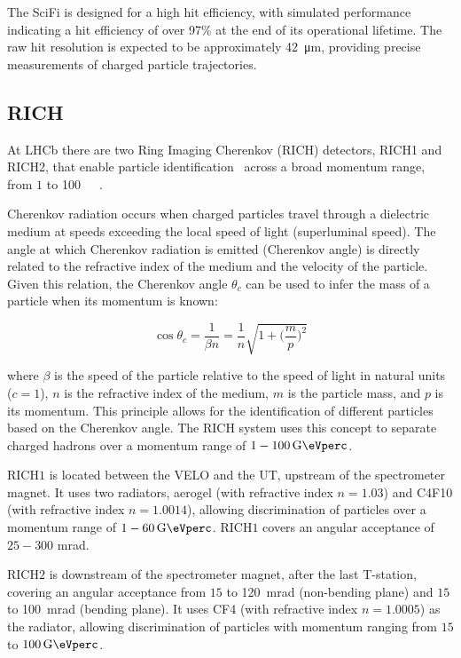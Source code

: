 The SciFi is designed for a high hit efficiency, with simulated performance indicating a hit efficiency of over 97\% at the end of its operational lifetime. The raw hit resolution is expected to be approximately \SI{42}{\micro\meter}, providing precise measurements of charged particle trajectories.

\subsection{RICH}
At LHCb there are two Ring Imaging Cherenkov (RICH) detectors, RICH1 and RICH2, that enable particle identification~\cite{LHCb:2013urp} across a broad momentum range, from $1$ to \SI[per-mode=symbol]{100}{\giga\eVperc}~\cite{Adinolfi_2013}.

Cherenkov radiation occurs when charged particles travel through a dielectric medium at speeds exceeding the local speed of light (superluminal speed). The angle at which Cherenkov radiation is emitted (Cherenkov angle) is directly related to the refractive index of the medium and the velocity of the particle. Given this relation, the Cherenkov angle $\theta_c$ can be used to infer the mass of a particle when its momentum is known:

\begin{equation}
    \cos\theta_c=\frac{1}{\beta n} = \frac{1}{n}\sqrt{1+\biggl(\frac{m}{p}\biggr)^2}
\end{equation}

where $\beta$ is the speed of the particle relative to the speed of light in natural units ($c=1$), $n$ is the refractive index of the medium, $m$ is the particle mass, and $p$ is its momentum.
This principle allows for the identification of different particles based on the Cherenkov angle. The RICH system uses this concept to separate charged hadrons over a momentum range of $1-\SI[per-mode=symbol]{100}{\giga\eVperc}$.

RICH$1$ is located between the VELO and the UT, upstream of the spectrometer magnet. It uses two radiators, aerogel (with refractive index $n=1.03$) and C4F10 (with refractive index $n=1.0014$), allowing discrimination of particles over a momentum range of $1-\SI[per-mode=symbol]{60}{\giga\eVperc}$. RICH$1$ covers an angular acceptance of $25-300$ mrad.

RICH$2$ is downstream of the spectrometer magnet, after the last T-station, covering an angular acceptance from $15$ to \SI{120}{\milli\radian} (non-bending plane) and $15$ to \SI{100}{\milli\radian} (bending plane). It uses CF4 (with refractive index $n=1.0005$) as the radiator, allowing discrimination of particles with momentum ranging from $15$ to $\SI[per-mode=symbol]{100}{\giga\eVperc}$. 

